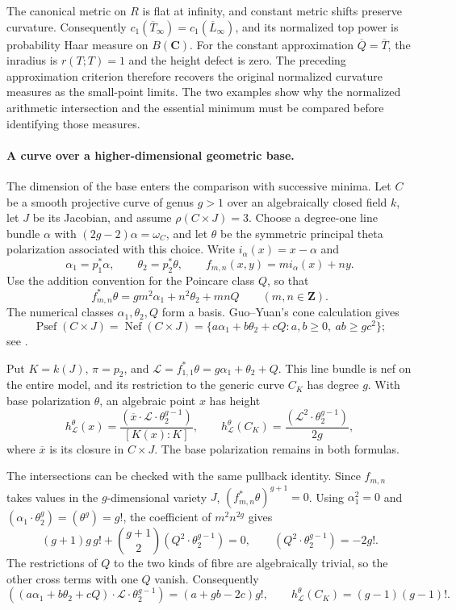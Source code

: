 The canonical metric on $R$ is flat at infinity, and constant
metric shifts preserve curvature. Consequently
$c_1(\overline T_\infty)=c_1(\overline L_\infty)$, and its normalized
top power is probability Haar measure on $B(\mathbf C)$.
For the constant approximation $\overline Q=\overline T$, the
inradius is $r(T;T)=1$ and the height defect is zero. The preceding
approximation criterion therefore recovers the original normalized
curvature measures as the small-point limits. The two examples
show why the normalized arithmetic intersection and the essential
minimum must be compared before identifying those measures.

\paragraph{A curve over a higher-dimensional geometric base.}
The dimension of the base enters the comparison with successive minima.
Let $C$ be a smooth projective curve of genus $g>1$ over an
algebraically closed field $k$, let $J$ be its Jacobian, and assume
$\rho(C\times J)=3$. Choose a degree-one line bundle $\alpha$ with
$(2g-2)\alpha=\omega_C$, and let $\theta$ be the symmetric principal
theta polarization associated with this choice. Write
$i_\alpha(x)=x-\alpha$ and
\[
 \alpha_1=p_1^*\alpha,\qquad \theta_2=p_2^*\theta,\qquad
 f_{m,n}(x,y)=m i_\alpha(x)+ny.
\]
Use the addition convention for the Poincare class $Q$, so that
\[
 f_{m,n}^*\theta=g m^2\alpha_1+n^2\theta_2+mnQ
 \qquad(m,n\in\mathbf Z).
\]
The numerical classes $\alpha_1,\theta_2,Q$ form a basis.
Guo--Yuan's cone calculation gives
\[
 \operatorname{Psef}(C\times J)=\operatorname{Nef}(C\times J)
 =\{a\alpha_1+b\theta_2+cQ:a,b\geq0,\ ab\geq gc^2\};
\]
see \cite[Proposition~2.2 and Theorem~2.4]{GY26RelativeMinimaV2}.

Put $K=k(J)$, $\pi=p_2$, and
$\mathcal L=f_{1,1}^*\theta=g\alpha_1+\theta_2+Q$.
This line bundle is nef on the entire model, and its restriction
to the generic curve $C_K$ has degree $g$.
With base polarization $\theta$, an algebraic point $x$ has height
\[
 h^\theta_{\mathcal L}(x)
   =\frac{(\overline x\cdot\mathcal L\cdot\theta_2^{g-1})}
           {[K(x):K]},
 \qquad
 h^\theta_{\mathcal L}(C_K)
   =\frac{(\mathcal L^2\cdot\theta_2^{g-1})}{2g},
\]
where $\overline x$ is its closure in $C\times J$.
The base polarization remains in both formulas.

The intersections can be checked with the same pullback identity.
Since $f_{m,n}$ takes values in the $g$-dimensional variety $J$,
$(f_{m,n}^*\theta)^{g+1}=0$.
Using $\alpha_1^2=0$ and
$(\alpha_1\cdot\theta_2^g)=(\theta^g)=g!$, the coefficient
of $m^2n^{2g}$ gives
\[
 (g+1)g\,g!+\binom{g+1}{2}(Q^2\cdot\theta_2^{g-1})=0,
 \qquad (Q^2\cdot\theta_2^{g-1})=-2g!.
\]
The restrictions of $Q$ to the two kinds of fibre are algebraically
trivial, so the other cross terms with one $Q$ vanish. Consequently
\[
 ((a\alpha_1+b\theta_2+cQ)\cdot\mathcal L\cdot\theta_2^{g-1})
                      =(a+gb-2c)g!,
 \qquad
 h^\theta_{\mathcal L}(C_K)=(g-1)(g-1)!.
\]

